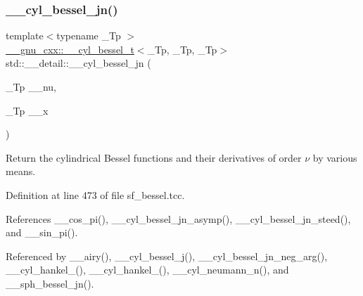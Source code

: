 \mbox{\label{namespacestd_1_1____detail_ae70ea3200a43241a3c6a73d3aa2dc1cc}} 
\subsubsection{\texorpdfstring{\+\_\+\+\_\+cyl\+\_\+bessel\+\_\+jn()}{\_\_cyl\_bessel\_jn()}}
{\footnotesize\ttfamily template$<$typename \+\_\+\+Tp $>$ \\
\hyperlink{struct____gnu__cxx_1_1____cyl__bessel__t}{\+\_\+\+\_\+gnu\+\_\+cxx\+::\+\_\+\+\_\+cyl\+\_\+bessel\+\_\+t}$<$\+\_\+\+Tp, \+\_\+\+Tp, \+\_\+\+Tp$>$ std\+::\+\_\+\+\_\+detail\+::\+\_\+\+\_\+cyl\+\_\+bessel\+\_\+jn (\begin{DoxyParamCaption}\item[{\+\_\+\+Tp}]{\+\_\+\+\_\+nu,  }\item[{\+\_\+\+Tp}]{\+\_\+\+\_\+x }\end{DoxyParamCaption})}



Return the cylindrical Bessel functions and their derivatives of order $ \nu $ by various means. 



Definition at line 473 of file sf\+\_\+bessel.\+tcc.



References \+\_\+\+\_\+cos\+\_\+pi(), \+\_\+\+\_\+cyl\+\_\+bessel\+\_\+jn\+\_\+asymp(), \+\_\+\+\_\+cyl\+\_\+bessel\+\_\+jn\+\_\+steed(), and \+\_\+\+\_\+sin\+\_\+pi().



Referenced by \+\_\+\+\_\+airy(), \+\_\+\+\_\+cyl\+\_\+bessel\+\_\+j(), \+\_\+\+\_\+cyl\+\_\+bessel\+\_\+jn\+\_\+neg\+\_\+arg(), \+\_\+\+\_\+cyl\+\_\+hankel\+\_(), \+\_\+\+\_\+cyl\+\_\+hankel\+\_(), \+\_\+\+\_\+cyl\+\_\+neumann\+\_\+n(), and \+\_\+\+\_\+sph\+\_\+bessel\+\_\+jn().

\mbox{\label{namespacestd_1_1____detail_aeab3c6b4c96d8885871d2973b77e537f}} 
